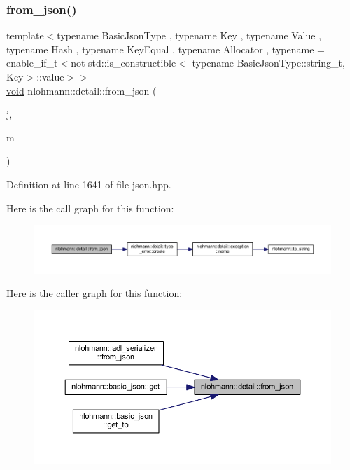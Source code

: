 \subsubsection{\texorpdfstring{from\_json()}{from\_json()}\hspace{0.1cm}{\footnotesize\ttfamily [18/18]}}
{\footnotesize\ttfamily template$<$typename Basic\+Json\+Type , typename Key , typename Value , typename Hash , typename Key\+Equal , typename Allocator , typename  = enable\+\_\+if\+\_\+t$<$not std\+::is\+\_\+constructible$<$                                     typename Basic\+Json\+Type\+::string\+\_\+t, Key$>$\+::value$>$$>$ \\
\mbox{\hyperlink{namespacenlohmann_1_1detail_a59fca69799f6b9e366710cb9043aa77d}{void}} nlohmann\+::detail\+::from\+\_\+json (\begin{DoxyParamCaption}\item[{const Basic\+Json\+Type \&}]{j,  }\item[{std\+::unordered\+\_\+map$<$ Key, Value, Hash, Key\+Equal, Allocator $>$ \&}]{m }\end{DoxyParamCaption})}



Definition at line 1641 of file json.\+hpp.

Here is the call graph for this function\+:
\nopagebreak
\begin{figure}[H]
\begin{center}
\leavevmode
\includegraphics[width=350pt]{namespacenlohmann_1_1detail_aef5c8ea108f4d2b03fb4a635617510de_cgraph}
\end{center}
\end{figure}
Here is the caller graph for this function\+:
\nopagebreak
\begin{figure}[H]
\begin{center}
\leavevmode
\includegraphics[width=350pt]{namespacenlohmann_1_1detail_aef5c8ea108f4d2b03fb4a635617510de_icgraph}
\end{center}
\end{figure}
\mbox{\label{namespacenlohmann_1_1detail_a40f7bb070a60e8ba14fffb9c117fcbd8}} 
